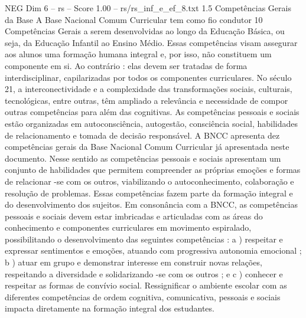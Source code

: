 \begin{textsample}{NEG Dim 6 – rs – Score 1.00 – rs/rs\_inf\_e\_ef\_8.txt}  \label{ex:f6_neg_102}
1.5 Competências Gerais da Base A Base Nacional Comum Curricular tem como fio condutor 10 Competências Gerais a serem desenvolvidas ao longo da Educação Básica, ou seja, da Educação Infantil ao Ensino Médio.
Essas competências visam assegurar aos alunos uma formação humana integral e, por isso, não constituem um componente em si.
Ao contrário : elas devem ser tratadas de forma interdisciplinar, capilarizadas por todos os componentes curriculares.
No século 21, a interconectividade e a complexidade das transformações sociais, culturais, tecnológicas, entre outras, têm ampliado a relevância e necessidade de compor outras competências para além das cognitivas.
As competências pessoais e sociais estão organizadas em autoconsciência, autogestão, consciência social, habilidades de relacionamento e tomada de decisão responsável.
A BNCC apresenta dez competências gerais da Base Nacional Comum Curricular já apresentada neste documento.
Nesse sentido as competências pessoais e sociais apresentam um conjunto de habilidades que permitem compreender as próprias emoções e formas de relacionar -se com os outros, viabilizando o autoconhecimento, colaboração e resolução de problemas.
Essas competências fazem parte da formação integral e do desenvolvimento dos sujeitos.
Em consonância com a BNCC, as competências pessoais e sociais devem estar imbricadas e articuladas com as áreas do conhecimento e componentes curriculares em movimento espiralado, possibilitando o desenvolvimento das seguintes competências : a ) respeitar e expressar sentimentos e emoções, atuando com progressiva autonomia emocional ; b ) atuar em grupo e demonstrar interesse em construir novas relações, respeitando a diversidade e solidarizando -se com os outros ; e c ) conhecer e respeitar as formas de convívio social.
Ressignificar o ambiente escolar com as diferentes competências de ordem cognitiva, comunicativa, pessoais e sociais impacta diretamente na formação integral dos estudantes.

\end{textsample}
